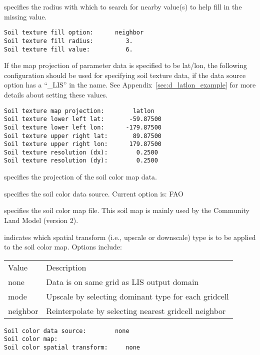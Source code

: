   specifies the radius with which
 to search for nearby value(s) to help fill in the missing value.
 

 \begin{Verbatim}[frame=single]
Soil texture fill option:      neighbor
Soil texture fill radius:         3.
Soil texture fill value:          6.
 \end{Verbatim}

 
 If the map projection of parameter data is specified to be lat/lon,
 the following configuration should be used for specifying soil
 texture data, if the data source option has a ``\_LIS'' in the name.
 See Appendix~\ref{sec:d_latlon_example} for more details about
 setting these values.
 

 \begin{Verbatim}[frame=single]
Soil texture map projection:        latlon
Soil texture lower left lat:       -59.87500
Soil texture lower left lon:      -179.87500
Soil texture upper right lat:       89.87500
Soil texture upper right lon:      179.87500
Soil texture resolution (dx):        0.2500
Soil texture resolution (dy):        0.2500
 \end{Verbatim}

 
  specifies the projection of the
 soil color map data.

  specifies the soil color data source.
  Current option is:  FAO

  specifies the soil color map file.
  This soil map is mainly used by the Community Land Model (version 2).

  indicates which spatial transform
 (i.e., upscale or downscale) type is to be applied to the soil color
 map.  Options include:

 \begin{tabular}{ll}
 Value & Description                                          \\
 none  & Data is on same grid as LIS output domain            \\
 mode  & Upscale by selecting dominant type for each gridcell \\
 neighbor  & Reinterpolate by selecting nearest gridcell neighbor \\
 \end{tabular}
 

 \begin{Verbatim}[frame=single]
Soil color data source:        none
Soil color map:         
Soil color spatial transform:     none
 \end{Verbatim}

